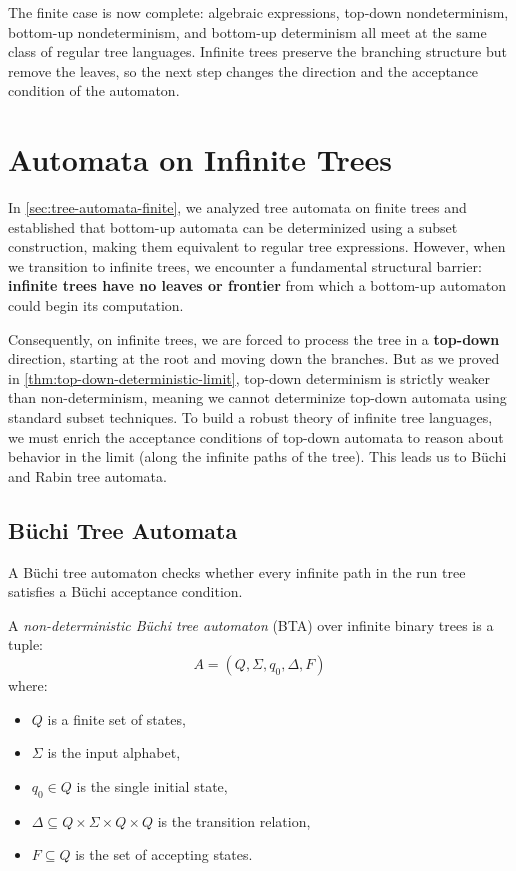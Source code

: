The finite case is now complete: algebraic expressions, top-down nondeterminism, bottom-up nondeterminism, and bottom-up determinism all meet at the same class of regular tree languages. Infinite trees preserve the branching structure but remove the leaves, so the next step changes the direction and the acceptance condition of the automaton.

\section{Automata on Infinite Trees}
\label{sec:automata-infinite-trees}

In \cref{sec:tree-automata-finite}, we analyzed tree automata on finite trees and established that bottom-up automata can be determinized using a subset construction, making them equivalent to regular tree expressions. However, when we transition to infinite trees, we encounter a fundamental structural barrier: \textbf{infinite trees have no leaves or frontier} from which a bottom-up automaton could begin its computation.

Consequently, on infinite trees, we are forced to process the tree in a \textbf{top-down} direction, starting at the root and moving down the branches. But as we proved in \cref{thm:top-down-deterministic-limit}, top-down determinism is strictly weaker than non-determinism, meaning we cannot determinize top-down automata using standard subset techniques. To build a robust theory of infinite tree languages, we must enrich the acceptance conditions of top-down automata to reason about behavior in the limit (along the infinite paths of the tree). This leads us to Büchi and Rabin tree automata.

\subsection{Büchi Tree Automata}
A Büchi tree automaton checks whether every infinite path in the run tree satisfies a Büchi acceptance condition.

\begin{definition}
A \emph{non-deterministic Büchi tree automaton} (BTA) over infinite binary trees is a tuple:
$$A = (Q, \Sigma, q_0, \Delta, F)$$
where:
\begin{itemize}
    \item $Q$ is a finite set of states,
    \item $\Sigma$ is the input alphabet,
    \item $q_0 \in Q$ is the single initial state,
    \item $\Delta \subseteq Q \times \Sigma \times Q \times Q$ is the transition relation,
    \item $F \subseteq Q$ is the set of accepting states.
\end{itemize}
\end{definition}

